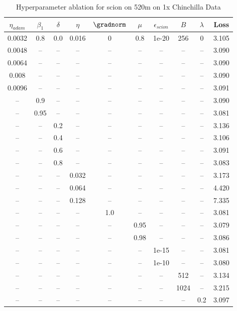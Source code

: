 \begin{table}[h!]
\centering
\caption{Hyperparameter ablation for scion on 520m on 1x Chinchilla Data}
\label{tab:ablation_scion_520m_on_1x_chinchilla_data}
\begin{tabular}{cccccccccc}
\toprule
$\eta_{adam}$ & $\beta_1$ & $\delta$ & $\eta$ & $\gradnorm$ & $\mu$ & $\epsilon_{scion}$ & $B$ & $\lambda$ & Loss \\
\midrule
0.0032 & 0.8 & 0.0 & 0.016 & 0 & 0.8 & 1e-20 & 256 & 0 & 3.105 \\
\midrule
0.0048 & -- & -- & -- & -- & -- & -- & -- & -- & 3.090 \\
0.0064 & -- & -- & -- & -- & -- & -- & -- & -- & 3.090 \\
0.008 & -- & -- & -- & -- & -- & -- & -- & -- & 3.090 \\
0.0096 & -- & -- & -- & -- & -- & -- & -- & -- & 3.091 \\
-- & 0.9 & -- & -- & -- & -- & -- & -- & -- & 3.090 \\
-- & 0.95 & -- & -- & -- & -- & -- & -- & -- & 3.081 \\
-- & -- & 0.2 & -- & -- & -- & -- & -- & -- & 3.136 \\
-- & -- & 0.4 & -- & -- & -- & -- & -- & -- & 3.106 \\
-- & -- & 0.6 & -- & -- & -- & -- & -- & -- & 3.091 \\
-- & -- & 0.8 & -- & -- & -- & -- & -- & -- & 3.083 \\
-- & -- & -- & 0.032 & -- & -- & -- & -- & -- & 3.173 \\
-- & -- & -- & 0.064 & -- & -- & -- & -- & -- & 4.420 \\
-- & -- & -- & 0.128 & -- & -- & -- & -- & -- & 7.335 \\
-- & -- & -- & -- & 1.0 & -- & -- & -- & -- & 3.081 \\
-- & -- & -- & -- & -- & 0.95 & -- & -- & -- & 3.079 \\
-- & -- & -- & -- & -- & 0.98 & -- & -- & -- & 3.086 \\
-- & -- & -- & -- & -- & -- & 1e-15 & -- & -- & 3.081 \\
-- & -- & -- & -- & -- & -- & 1e-10 & -- & -- & 3.080 \\
-- & -- & -- & -- & -- & -- & -- & 512 & -- & 3.134 \\
-- & -- & -- & -- & -- & -- & -- & 1024 & -- & 3.215 \\
-- & -- & -- & -- & -- & -- & -- & -- & 0.2 & 3.097 \\
\bottomrule
\end{tabular}
\end{table}

